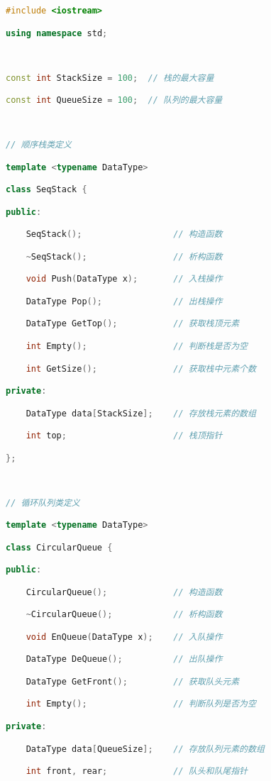 \begin{lstlisting}[language=C++]
#include <iostream>

using namespace std;

  

const int StackSize = 100;  // 栈的最大容量

const int QueueSize = 100;  // 队列的最大容量

  

// 顺序栈类定义

template <typename DataType>

class SeqStack {

public:

    SeqStack();                  // 构造函数

    ~SeqStack();                 // 析构函数

    void Push(DataType x);       // 入栈操作

    DataType Pop();              // 出栈操作

    DataType GetTop();           // 获取栈顶元素

    int Empty();                 // 判断栈是否为空

    int GetSize();               // 获取栈中元素个数

private:

    DataType data[StackSize];    // 存放栈元素的数组

    int top;                     // 栈顶指针

};

  

// 循环队列类定义

template <typename DataType>

class CircularQueue {

public:

    CircularQueue();             // 构造函数

    ~CircularQueue();            // 析构函数

    void EnQueue(DataType x);    // 入队操作

    DataType DeQueue();          // 出队操作

    DataType GetFront();         // 获取队头元素

    int Empty();                 // 判断队列是否为空

private:

    DataType data[QueueSize];    // 存放队列元素的数组

    int front, rear;             // 队头和队尾指针


\end{lstlisting}
